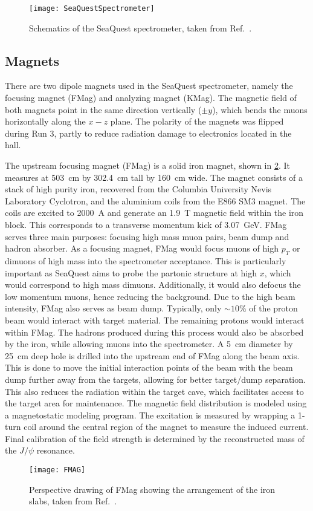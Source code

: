 \documentclass[../main.tex]{subfiles}
\begin{document}
\begin{figure}[htbp!]
	\centering
	\texttt{[image: SeaQuestSpectrometer]}
	\caption{Schematics of the SeaQuest spectrometer, taken from Ref.~\cite{aidala2019}.}
	\label{fig:spectrometer}
\end{figure}

\subsection{Magnets}
There are two dipole magnets used in the SeaQuest spectrometer, namely the focusing
magnet (FMag) and analyzing magnet (KMag). The magnetic field of both magnets point
in the same direction vertically ($\pm y$), which bends the muons horizontally along
the $x-z$ plane. The polarity of the magnets was flipped during Run 3, partly to reduce
radiation damage to electronics located in the hall.

The upstream focusing magnet (FMag) is a solid iron magnet, shown in \cref{fig:fmag}.
It measures at \SI{503}{\cm} by \SI{302.4}{\cm} tall by \SI{160}{\cm} wide.
The magnet consists of a stack of high purity iron, recovered from
the Columbia University Nevis Laboratory Cyclotron, and the aluminium coils from the E866
SM3 magnet. The coils are excited to \SI{2000}{\ampere} and generate an \SI{1.9}{\tesla}
magnetic field within the iron block. This corresponds to a transverse momentum kick of
\SI{3.07}{\GeV}. FMag serves three main purposes: focusing high mass muon pairs, beam
dump and hadron absorber. As a focusing magnet, FMag would focus muons of high $p_T$
or dimuons of high mass into the spectrometer acceptance. This is particularly important as SeaQuest
aims to probe the partonic structure at high $x$, which would correspond to high mass dimuons.
Additionally, it would also defocus the low momentum muons, hence reducing the background.
Due to the high beam intensity, FMag also serves as beam dump. Typically, only $\sim 10\%$
of the proton beam would interact with target material. The remaining protons would interact
within FMag. The hadrons produced during this process would also be absorbed by the iron,
while allowing muons into the spectrometer.
A \SI{5}{\cm} diameter by \SI{25}{\cm} deep hole is drilled into the upstream
end of FMag along the beam axis. This is done to move the initial interaction points
of the beam with the beam dump further away from the targets, allowing for better target/dump
separation. This also reduces the radiation within the target cave, which facilitates
access to the target area for maintenance.
The magnetic field distribution is modeled using a magnetostatic modeling program. The
excitation is measured by wrapping a 1-turn coil around the central region of the magnet to measure the induced
current. Final calibration of the field strength is determined by the reconstructed
mass of the $J/\psi$ resonance.
\begin{figure}[h!]
	\centering
	\texttt{[image: FMAG]}
	\caption{Perspective drawing of FMag showing the arrangement of the iron slabs,
		taken from Ref.~\cite{aidala2019}.}
	\label{fig:fmag}
\end{figure}
\end{document}
